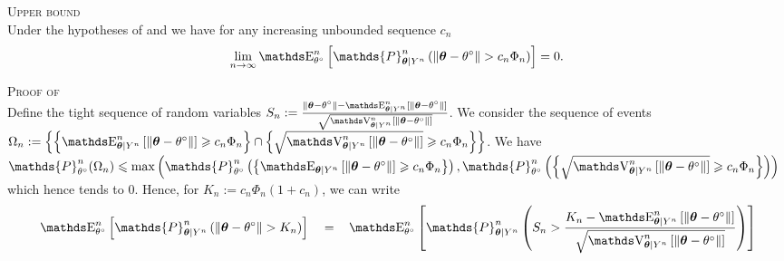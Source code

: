 \begin{thm}\label{THM_BAYES_STRATEGIES_MOMENT}{\textsc{Upper bound}\\}
Under the hypotheses of  and  we have for any increasing unbounded sequence $c_{n}$
\[\lim\limits_{n \rightarrow \infty} \E_{\theta^{\circ}}^{n}\left[\mathds{P}^{n}_{\boldsymbol{\theta} \vert Y^{n}}\left(\Vert \boldsymbol{\theta} - \theta^{\circ} \Vert > c_{n}\Phi_{n} \right)\right] = 0.\]
\end{thm}

\begin{pro}\label{PRO_BAYES_STRATEGIES_MOMENT}{\textsc{Proof of }\\}
Define the tight sequence of random variables $S_{n} := \frac{\Vert \boldsymbol{\theta} - \theta^{\circ} \Vert - \E^{n}_{\boldsymbol{\theta} \vert Y^{n}}\left[\Vert \boldsymbol{\theta} - \theta^{\circ} \Vert\right]}{\sqrt{\V^{n}_{\boldsymbol{\theta} \vert Y^{n}}\left[\Vert \boldsymbol{\theta} - \theta^{\circ} \Vert\right]}}$.
We consider the sequence of events $\Omega_{n} := \left\{\left\{\E^{n}_{\boldsymbol{\theta} \vert Y^{n}}\left[\Vert \boldsymbol{\theta} - \theta^{\circ} \Vert\right] \geq c_{n} \Phi_{n}\right\} \cap \left\{\sqrt{\V^{n}_{\boldsymbol{\theta} \vert Y^{n}}\left[\Vert \boldsymbol{\theta} - \theta^{\circ} \Vert\right]} \geq c_{n} \Phi_{n}\right\}\right\}$.
We have $\mathds{P}^{n}_{\theta^{\circ}}(\Omega_{n}) \leq \max\left(\mathds{P}^{n}_{\theta^{\circ}}\left(\left\{\E_{\boldsymbol{\theta} \vert Y^{n}}\left[\Vert \boldsymbol{\theta} - \theta^{\circ} \Vert\right] \geq c_{n} \Phi_{n}\right\}\right), \mathds{P}^{n}_{\theta^{\circ}}\left(\left\{\sqrt{\V^{n}_{\boldsymbol{\theta} \vert Y^{n}}\left[\Vert \boldsymbol{\theta} - \theta^{\circ} \Vert\right]} \geq c_{n} \Phi_{n}\right\}\right)\right)$ which hence tends to $0$.
Hence, for $K_{n} := c_{n} \Phi_{n} (1 + c_{n})$, we can write
\begin{alignat*}{3}
& \E_{\theta^{\circ}}^{n}\left[\mathds{P}^{n}_{\boldsymbol{\theta} \vert Y^{n}}\left(\Vert \boldsymbol{\theta} - \theta^{\circ} \Vert > K_{n} \right)\right] && = && \E_{\theta^{\circ}}^{n}\left[\mathds{P}^{n}_{\boldsymbol{\theta} \vert Y^{n}}\left(S_{n} > \frac{K_{n} - \E^{n}_{\boldsymbol{\theta} \vert Y^{n}}\left[\Vert \boldsymbol{\theta} - \theta^{\circ} \Vert\right]}{\sqrt{\V^{n}_{\boldsymbol{\theta} \vert Y^{n}}\left[\Vert \boldsymbol{\theta} - \theta^{\circ} \Vert\right]}} \right)\right]\\

\end{alignat*}
\end{pro}
